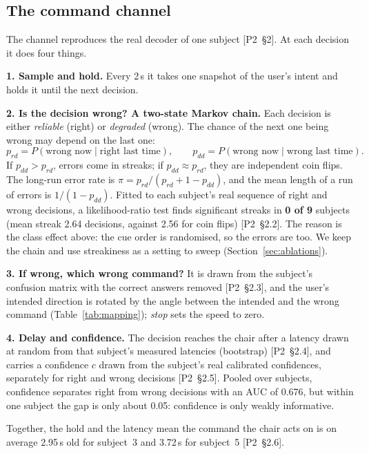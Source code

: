 \documentclass[11pt,a4paper]{article}
\newcommand{\ptwo}[1]{{\small\textsf{[P2~\S#1]}}}
\begin{document}
\subsection{The command channel}
\label{sec:channel}
The channel reproduces the real decoder of one subject \ptwo{2}. At each
decision it does four things.

\textbf{1. Sample and hold.} Every 2\,s it takes one snapshot of the
user's intent and holds it until the next decision.

\textbf{2. Is the decision wrong? A two-state Markov chain.} Each
decision is either \emph{reliable} (right) or \emph{degraded} (wrong).
The chance of the next one being wrong may depend on the last one:
\begin{equation}
p_{rd} = P(\text{wrong now} \mid \text{right last time}),\qquad
p_{dd} = P(\text{wrong now} \mid \text{wrong last time}).
\end{equation}
If $p_{dd} > p_{rd}$, errors come in streaks; if $p_{dd} \approx p_{rd}$,
they are independent coin flips. The long-run error rate is
$\pi = p_{rd}/(p_{rd} + 1 - p_{dd})$, and the mean length of a run of
errors is $1/(1-p_{dd})$. Fitted to each subject's real sequence of right
and wrong decisions, a likelihood-ratio test finds significant streaks in
\textbf{0 of 9} subjects (mean streak 2.64 decisions, against 2.56 for
coin flips) \ptwo{2.2}. The reason is the class effect above: the cue
order is randomised, so the errors are too. We keep the chain and use
streakiness as a setting to sweep (Section~\ref{sec:ablations}).

\textbf{3. If wrong, which wrong command?} It is drawn from the
subject's confusion matrix with the correct answers removed
\ptwo{2.3}, and the user's intended direction is rotated by the angle
between the intended and the wrong command (Table~\ref{tab:mapping});
\emph{stop} sets the speed to zero.

\textbf{4. Delay and confidence.} The decision reaches the chair after a
latency drawn at random from that subject's measured latencies
(bootstrap) \ptwo{2.4}, and carries a confidence $c$ drawn from the
subject's real calibrated confidences, separately for right and wrong
decisions \ptwo{2.5}. Pooled over subjects, confidence separates right
from wrong decisions with an AUC of 0.676, but within one subject the gap
is only about 0.05: confidence is only weakly informative.

Together, the hold and the latency mean the command the chair acts on is
on average 2.95\,s old for subject~3 and 3.72\,s for subject~5
\ptwo{2.6}.
\end{document}
